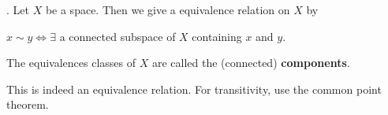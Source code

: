 
.  Let \(X\) be a space. Then we give a equivalence relation on \(X\) by
\begin{center}
    \(x \sim y \iff \exists\) a connected subspace of \(X\) containing \(x\) and \(y\).
\end{center}
The equivalences classes of \(X\) are called the (connected) \textbf{components}.

\rmk This is indeed an equivalence relation. For transitivity, use the common point theorem.

\pagebreak
